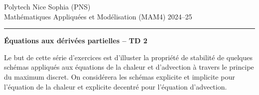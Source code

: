 \documentclass[12pt,a4paper]{article}
\begin{document}
 \hfill Polytech Nice Sophia (PNS)\\
\noindent Math\'ematiques Appliqu\'ees et Mod\'elisation (MAM4) \hfill 2024--25 \\

\hrule

\bigskip
\bigskip

\begin{center}{\bf \'Equations aux d\'eriv\'ees partielles --
TD 2}\end{center}

\bigskip

\parskip 12pt
Le but de cette s\'erie d'exercices est d'illuster la propri\'et\'e de
stabilit\'e de quelques sch\'emas appliqu\'es aux \'equations de la
chaleur et d'advection \`a travers le principe du maximum discret. On
consid\'erera les sch\'emas explicite et implicite pour l'\'equation
de la chaleur et explicite decentr\'e pour l'\'equation d'advection.
\end{document}
